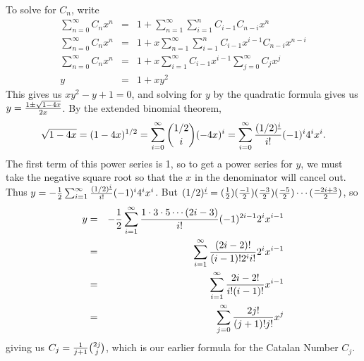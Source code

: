 {To solve for $C_n$, write
\begin{eqnarray*}
\sum_{n=0}^\infty C_nx^n &=&1+\sum_{n=1}^\infty\sum_{i=1}^nC_{i-1}C_{n-i}x^n\\
\sum_{n=0}^\infty C_nx^n
&=&1+x\sum_{n=1}^\infty\sum_{i=1}^nC_{i-1}x^{i-1}C_{n-i}x^{n-i}\\
\sum_{n=0}^\infty C_nx^n
&=&1+x\sum_{i=1}^\infty C_{i-1}x^{i-1}\sum_{j=0}^\infty C_{j}x^{j}\\
y&=&1 + xy^2
\end{eqnarray*}
This gives us $xy^2-y+1=0$, and solving for $y$ by the quadratic formula gives us
$y={1\pm \sqrt{1-4x}\over 2x}$.  By the extended binomial theorem,
$$\sqrt{1-4x}=(1-4x)^{1/2} = \sum_{i=0}^\infty {1/2\choose i}(-4x)^i=
\sum_{i=0}^\infty {(1/2)^{\underline{i}}\over i!}(-1)^i4^ix^i.$$
The first term of this power series is 1, so to get a power series for $y$, we must
take the negative square root so that the $x$ in the denominator will cancel
out.  Thus $y=-{1\over2}\sum_{i=1}^\infty {(1/2)^{\underline{i}}\over
i!}(-1)^i4^ix^i$. But
$(1/2)^{\underline{i}}=({1\over2})({-1\over2})({-3\over2})({-5\over2})\cdots
({-2i+3\over 2})$, so 
\begin{eqnarray*}y&=&-{1\over2}\sum_{i=1}^\infty{1\cdot3\cdot5\cdots(2i-3)\over
i!}(-1)^{2i-1}2^ix^{i-1}\\
&=& \sum_{i=1}^\infty {(2i-2)!\over
(i-1)!2^{i}i!}2^ix^{i-1}\\&=& \sum_{i=1}^\infty{2i-2!\over i!(i-1)!}x^{i-1}\\
&=&\sum_{j=0}^\infty{2j!\over (j+1)!j!}x^j
\end{eqnarray*}
giving us $C_j={1\over j+1}{2j\choose j}$, which is our earlier formula for the
Catalan Number $C_j$.}


\ep

